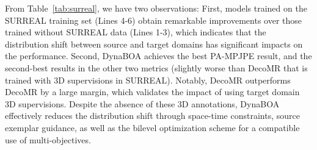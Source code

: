 \documentclass[10pt,journal,compsoc]{IEEEtran}
\let\MYoriglatexcaption\caption
\renewcommand{\caption}[2][\relax]{\MYoriglatexcaption[#2]{#2}}
\newcommand{\tab}[1]{Table~\ref{#1}}
\begin{document}
From \tab{tab:surreal}, we have two observations: First, models trained on the SURREAL training set (Lines 4-6) obtain remarkable improvements over those trained without SURREAL data (Lines 1-3), which indicates that the distribution shift between source and target domains has significant impacts on the performance. 
Second, DynaBOA achieves the best PA-MPJPE result, and the second-best results in the other two metrics (slightly worse than DecoMR that is trained with 3D supervisions in SURREAL). 
Notably, DecoMR outperforms DecoMR by a large margin, which validates the impact of using target domain 3D supervisions. 
Despite the absence of these 3D annotations, DynaBOA effectively reduces the distribution shift through space-time constraints, source exemplar guidance, as well as the bilevel optimization scheme for a compatible use of multi-objectives.








\begin{table}[t]
    \centering
    \caption{Results of using different online optimization schemes (\#PS on 3DPW). ``Single'' indicates the single-level multi-objective optimization, in which B4-B6 optimize multi-objectives in two stages. ``'' indicates utilizing the losses on the left first and then on the right in different optimization steps.
}
    \vspace{-5pt}
    \label{tab:bilevel_ablates}
\end{table}
\end{document}
